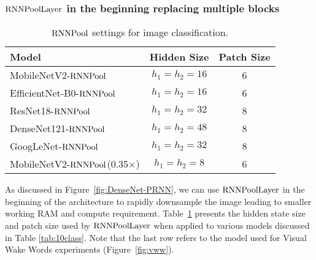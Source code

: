 \documentclass[10pt]{article}
\newcommand{\rpool}{\ensuremath{{\rm RNNPool}}\xspace}
\newcommand{\rpoollayer}{\ensuremath{{\rm RNNPoolLayer}}\xspace}
\begin{document}
\subsubsection{\rpoollayer in the beginning replacing multiple blocks}
\begin{table}[!ht]
\centering
    \caption{\small \rpool settings for image classification.}

\begin{tabular}{l | c |c}
  \toprule
  Model  & Hidden Size &  Patch Size \\
  \midrule
  MobileNetV2-\rpool & $h_1=h_2=16$ & 6\\  
  EfficientNet-B0-\rpool & $h_1=h_2=16$ & 6\\  
  ResNet18-\rpool & $h_1=h_2=32$ & 8\\  
  DenseNet121-\rpool & $h_1=h_2=48$ & 8\\
  GoogLeNet-\rpool & $h_1=h_2=32$ & 8\\
  MobileNetV2-\rpool (0.35$\times$) & $h_1=h_2=8$ & 6\\
  \bottomrule
\end{tabular}
\label{tab:rpool-hparam-img}
\end{table} \label{sec:toprep}
As discussed in Figure~\ref{fig:DenseNet-PRNN}, we can use \rpoollayer in the beginning of the architecture to rapidly downsample the image leading to smaller working RAM and compute requirement. Table~\ref{tab:rpool-hparam-img} presents the hidden state size and patch size used by \rpoollayer when applied to various models discussed in Table 
\ref{tab:10class}. 
Note that the last row refers to the model used for Visual Wake Words experiments (Figure~\ref{fig:vww}). 
\end{document}

